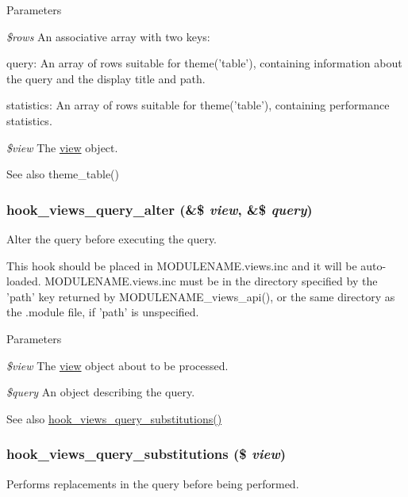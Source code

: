 \begin{DoxyParams}{Parameters}
\item[{\em \$rows}]An associative array with two keys:
\begin{DoxyItemize}
\item query: An array of rows suitable for theme('table'), containing information about the query and the display title and path.
\item statistics: An array of rows suitable for theme('table'), containing performance statistics. 
\end{DoxyItemize}\item[{\em \$view}]The \hyperlink{classview}{view} object. \end{DoxyParams}
\begin{DoxySeeAlso}{See also}
theme\_\-table() 
\end{DoxySeeAlso}
\hypertarget{group__views__hooks_gaf4d538493930fe0fa0ce6fb3bf42c156}{
\subsubsection[{hook\_\-views\_\-query\_\-alter}]{\setlength{\rightskip}{0pt plus 5cm}hook\_\-views\_\-query\_\-alter (\&\$ {\em view}, \/  \&\$ {\em query})}}
\label{group__views__hooks_gaf4d538493930fe0fa0ce6fb3bf42c156}
Alter the query before executing the query.

This hook should be placed in MODULENAME.views.inc and it will be auto-\/loaded. MODULENAME.views.inc must be in the directory specified by the 'path' key returned by MODULENAME\_\-views\_\-api(), or the same directory as the .module file, if 'path' is unspecified.


\begin{DoxyParams}{Parameters}
\item[{\em \$view}]The \hyperlink{classview}{view} object about to be processed. \item[{\em \$query}]An object describing the query. \end{DoxyParams}
\begin{DoxySeeAlso}{See also}
\hyperlink{group__views__hooks_gac3628ab1f08eee5a2bd9c3c4b5bd4c3b}{hook\_\-views\_\-query\_\-substitutions()} 
\end{DoxySeeAlso}
\hypertarget{group__views__hooks_gac3628ab1f08eee5a2bd9c3c4b5bd4c3b}{
\subsubsection[{hook\_\-views\_\-query\_\-substitutions}]{\setlength{\rightskip}{0pt plus 5cm}hook\_\-views\_\-query\_\-substitutions (\$ {\em view})}}
\label{group__views__hooks_gac3628ab1f08eee5a2bd9c3c4b5bd4c3b}
Performs replacements in the query before being performed.


